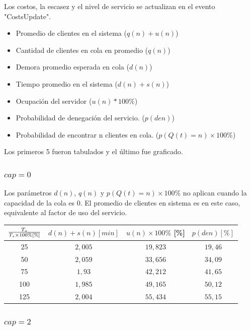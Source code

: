     Los costos, la escasez y el nivel de servicio se actualizan en el evento "CostsUpdate".
    \begin{itemize}
        \item Promedio de clientes en el sistema ($q(n)+u(n)$)
        \item Cantidad de clientes en cola en promedio ($q(n)$)
        \item Demora promedio esperada en cola ($d(n)$)
        \item Tiempo promedio en el sistema ($d(n)+s(n)$)
        \item Ocupación del servidor ($u(n)*100\%$)
        \item Probabilidad de denegación del servicio. ($p(den)$)
        \item Probabilidad de encontrar n clientes en cola. ($p(Q(t)=n)\times100\%$)
    \end{itemize}

    Los primeros 5 fueron tabulados y el último fue graficado.

    \subsubsection{$cap = 0$}

    Los parámetros $d(n)$, $q(n)$ y $p(Q(t)=n)\times100\%$ no aplican cuando la capacidad de la cola es 0.
    El promedio de clientes en sistema es en este caso, equivalente al factor de uso del servicio.

    \begin{tabular}{||c||c|c|c||}
        \hline \hline
        $T_a \over T_s\times100\% [\%]$ & $d(n)+s(n) [min]$ & $u(n)\times100\%$ [\%] & $p(den) [\%]$ \\
        \hline \hline
        25 & $2,005$ & $19,823$ & $19,46$ \\
        \hline
        50 & $2,059$ & $33,656$ & $34,09$ \\
        \hline
        75 & $1,93$ & $42,212$ & $41,65$ \\
        \hline
        100 & $1,985$ & $49,165$ & $50,12$ \\
        \hline
        125 & $2,004$ & $55,434$ & $55,15$ \\
        \hline \hline
    \end{tabular}

    \subsubsection{$cap = 2$}

